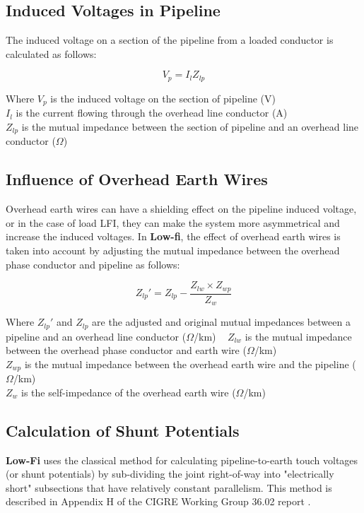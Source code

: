 \documentclass{article}
\begin{document}
\subsection{Induced Voltages in Pipeline}
The induced voltage on a section of the pipeline from a loaded conductor is calculated as follows:

\begin{equation}
V_{p} = I_{l} Z_{lp}
\end{equation}

Where $V_p$ is the induced voltage on the section of pipeline (V) \\
\hphantom{Where} $I_{l}$ is the current flowing through the overhead line conductor (A) \\
\hphantom{Where} $Z_{lp}$ is the mutual impedance between the section of pipeline and an overhead line conductor ($\Omega$)

\subsection{Influence of Overhead Earth Wires}
Overhead earth wires can have a shielding effect on the pipeline induced voltage, or in the case of load LFI, they can make the system more asymmetrical and increase the induced voltages. In \textbf{Low-fi}, the effect of overhead earth wires is taken into account by adjusting the mutual impedance between the overhead phase conductor and pipeline as follows:

\begin{equation}
Z_{lp}' = Z_{lp} - \frac{Z_{lw} \times Z_{wp}}{Z_{w}}
\end{equation}

Where $Z_{lp}'$ and $Z_{lp}$ are the adjusted and original mutual impedances between a pipeline and an overhead line conductor ($\Omega$/km) \
\hphantom{Where} $Z_{lw}$ is the mutual impedance between the overhead phase conductor and earth wire ($\Omega$/km) \\
\hphantom{Where} $Z_{wp}$ is the mutual impedance between the overhead earth wire and the pipeline ($\Omega$/km) \\
\hphantom{Where} $Z_{w}$ is the self-impedance of the overhead earth wire ($\Omega$/km)

\subsection{Calculation of Shunt Potentials}
\textbf{Low-Fi} uses the classical method for calculating pipeline-to-earth touch voltages (or shunt potentials) by sub-dividing the joint right-of-way into "electrically short" subsections that have relatively constant parallelism. This method is described in Appendix H of the CIGRE Working Group 36.02 report \cite{cigre_1995}.
\end{document}
